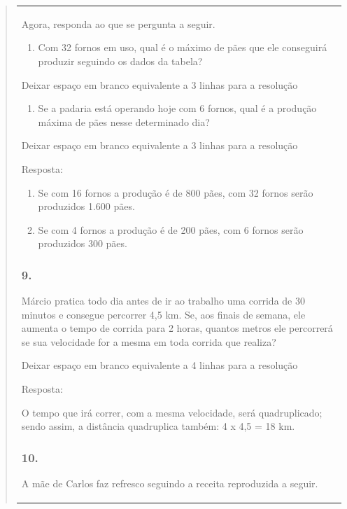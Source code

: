 \begin{enumerate}
\begin{escolha}
\begin{enumerate}
\begin{itemize}
\begin{itemize}
\begin{escolha}
\begin{quote}
\begin{escolha}
{\begin{longtable}[]{@{}l@{}}
\begin{itemize}
Agora, responda ao que se pergunta a seguir.

\begin{enumerate}
\def\labelenumi{\alph{enumi})}
\item
  Com 32 fornos em uso, qual é o máximo de pães que ele conseguirá
  produzir seguindo os dados da tabela?
\end{enumerate}

Deixar espaço em branco equivalente a 3 linhas para a resolução

\begin{enumerate}
\def\labelenumi{\alph{enumi})}
\item
  Se a padaria está operando hoje com 6 fornos, qual é a produção máxima
  de pães nesse determinado dia?
\end{enumerate}

Deixar espaço em branco equivalente a 3 linhas para a resolução

Resposta:

\begin{enumerate}
\def\labelenumi{\alph{enumi})}
\item
  Se com 16 fornos a produção é de 800 pães, com 32 fornos serão produzidos 1.600 pães.
\item
  Se com 4 fornos a produção é de 200 pães, com 6 fornos serão produzidos 300 pães.
\end{enumerate}

\subsubsection{9.}\label{section-125}

Márcio pratica todo dia antes de ir ao trabalho uma corrida de 30
minutos e consegue percorrer 4,5 km. Se, aos finais de semana, ele aumenta o
tempo de corrida para 2 horas, quantos metros ele percorrerá se sua
velocidade for a mesma em toda corrida que realiza?

Deixar espaço em branco equivalente a 4 linhas para a resolução

Resposta:

O tempo que irá correr, com a mesma velocidade, será quadruplicado; sendo assim, a distância quadruplica também: 4 x 4,5 = 18 km.

\subsubsection{10.}\label{section-126}

A mãe de Carlos faz refresco seguindo a receita reproduzida a seguir.


\end{itemize}
\end{longtable}}
\end{escolha}
\end{quote}
\end{escolha}
\end{itemize}
\end{itemize}
\end{enumerate}
\end{escolha}
\end{enumerate}
